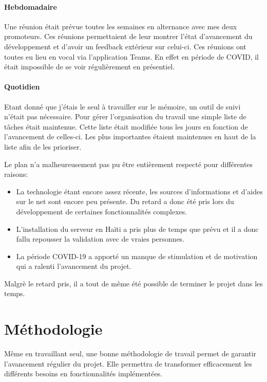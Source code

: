 \documentclass{EPL-master-thesis-covers-FR}
\begin{document}
				\paragraph*{Hebdomadaire} 
				Une réunion était prévue toutes les semaines en alternance avec mes deux promoteurs. Ces réunions permettaient de leur montrer l'état d'avancement du développement et d'avoir un feedback extérieur sur celui-ci. 
				Ces réunions ont toutes eu lieu en vocal via l'application Teams. En effet en période de COVID, il était impossible de se voir régulièrement en présentiel.
				
				\paragraph*{Quotidien}
				Etant donné que j'étais le seul à travailler sur le mémoire, un outil de suivi n'était pas nécessaire. Pour gérer l'organisation du travail une simple liste de tâches était maintenue. Cette liste était modifiée tous les jours en fonction de l'avancement de celles-ci. Les plus importantes étaient maintenues en haut de la liste afin de les prioriser. 
				
				Le plan n'a malheureusement pas pu être entièrement respecté pour différentes raisons:
				\begin{itemize}
					\item La technologie étant encore assez récente, les sources d'informations et d'aides sur le net sont encore peu présente. Du retard a donc été pris lors du développement de certaines fonctionnalités complexes.
					\item L'installation du serveur en Haïti a pris plus de temps que prévu et il a donc fallu repousser la validation avec de vraies personnes. 
					\item La période COVID-19 a apporté un manque de stimulation et de motivation qui a ralenti l'avancement du projet.
				
				\end{itemize}				
				
				Malgrè le retard pris, il a tout de même été possible de terminer le projet dans les temps.
				
				
		\section{Méthodologie}
			Même en travaillant seul, une bonne méthodologie de travail permet de garantir l'avancement régulier du projet. Elle permettra de transformer efficacement les différents besoins en fonctionnalités implémentées.
			
\end{document}
